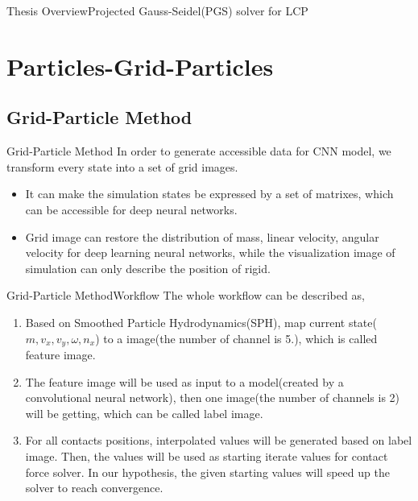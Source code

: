 \documentclass{beamer}
\begin{document}
\begin{frame}{Thesis Overview}{Projected Gauss-Seidel(PGS) solver for LCP}
\begin{algorithm}[H]
\end{algorithm}
\end{frame}

\section{Particles-Grid-Particles}

\subsection{Grid-Particle Method}
\begin{frame}{Grid-Particle Method}
In order to generate accessible data for CNN model, we transform every state into a set of grid images.
\begin{itemize}
\item {It can make the simulation states be expressed by a set of matrixes, which can be accessible for deep neural networks.}
    \pause
\item Grid image can restore the distribution of mass, linear velocity, angular velocity for deep learning neural networks, while the visualization image of simulation can only describe the position of rigid.
\end{itemize}
\end{frame}
\begin{frame}{Grid-Particle Method}{Workflow}
The whole workflow can be described as,
\begin{enumerate}
\item {
Based on Smoothed Particle Hydrodynamics(SPH), map current state(\(m, v_x, v_y, \omega, n_x\)) to a image(the number of channel is 5.), which is called feature image.
\pause
}
\item {
The feature image will be used as input to a model(created by a convolutional neural network), then one image(the number of channels is 2) will be getting, which can be called label image.
\pause
}
\item {
For all contacts positions, interpolated values will be generated based on label image. Then, the values will be used as starting iterate values for contact force solver. In our hypothesis, the given starting values will speed up the solver to reach convergence.
}

\end{enumerate}
\end{frame}
\end{document}
